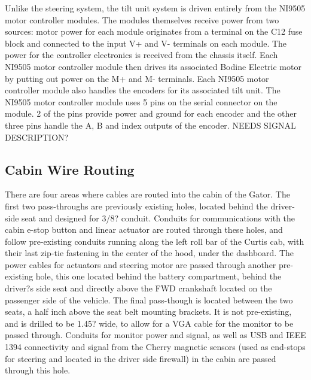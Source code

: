\noindent Unlike the steering system, the tilt unit system is driven entirely from the NI9505 motor controller modules. The modules themselves receive power from two sources: motor power for each module originates from a terminal on the C12 fuse block and connected to the input V+ and V- terminals on each module. The power for the controller electronics is received from the chassis itself. Each NI9505 motor controller module then drives its associated Bodine Electric motor by putting out power on the M+ and M- terminals. Each NI9505 motor controller module also handles the encoders for its associated tilt unit. The NI9505 motor controller module uses 5 pins on the serial connector on the module. 2 of the pins provide power and ground for each encoder and the other three pins handle the A, B and index outputs of the encoder. NEEDS SIGNAL DESCRIPTION?

\subsection{Cabin Wire Routing}

There are four areas where cables are routed into the cabin of the Gator. The first two pass-throughs are previously existing holes, located behind the driver-side seat and designed for 3/8? conduit. Conduits for communications with the cabin e-stop button and linear actuator are routed through these holes, and follow pre-existing conduits running along the left roll bar of the Curtis cab, with their last zip-tie fastening in the center of the hood, under the dashboard. The power cables for actuators and steering motor are passed through another pre-existing hole, this one located behind the battery compartment, behind the driver?s side seat and directly above the FWD crankshaft located on the passenger side of the vehicle. The final pass-though is located between the two seats, a half inch above the seat belt mounting brackets. It is not pre-existing, and is drilled to be 1.45? wide, to allow for a VGA cable for the monitor to be passed through. Conduits for monitor power and signal, as well as USB and IEEE 1394 connectivity and signal from the Cherry magnetic sensors (used as end-stops for steering and located in the driver side firewall) in the cabin are passed through this hole.
